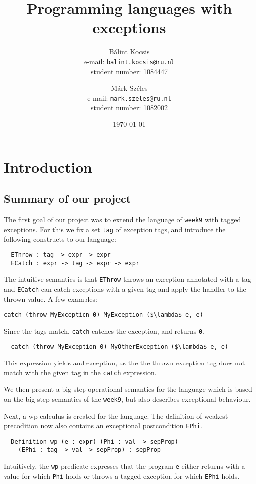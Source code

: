 \documentclass{article}
\title{Programming languages with exceptions}
\author{Bálint Kocsis \\ e-mail: \texttt{balint.kocsis@ru.nl} \\ student number: 1084447
\and
Márk Széles \\ e-mail: \texttt{mark.szeles@ru.nl} \\ student number: 1082002}
\date{\today}
\begin{document}
\maketitle

\section{Introduction}

\subsection{Summary of our project}

The first goal of our project was to extend the language of \texttt{week9} with tagged exceptions. For this we fix a set \texttt{tag} of exception tags, and introduce the following constructs to our language:
\begin{lstlisting}
  EThrow : tag -> expr -> expr
  ECatch : expr -> tag -> expr -> expr
\end{lstlisting}
The intuitive semantics is that \texttt{EThrow} throws an exception annotated with a tag and \texttt{ECatch} can catch exceptions with a given tag and apply the handler to the thrown value. A few examples:

\begin{lstlisting}[mathescape]
  catch (throw MyException 0) MyException ($\lambda$ e, e)
\end{lstlisting}
Since the tags match, \texttt{catch} catches the exception, and returns \texttt{0}.

\begin{lstlisting}
  catch (throw MyException 0) MyOtherException ($\lambda$ e, e)
\end{lstlisting}
This expression yields and exception, as the the thrown exception tag does not match with the given tag in the \texttt{catch} expression.

We then present a big-step operational semantics for the language which is based on the big-step semantics of the \texttt{week9}, but also describes exceptional behaviour.

Next, a wp-calculus is created for the language. The definition of weakest precodition now also contains an exceptional postcondition \texttt{EPhi}.
\begin{lstlisting}
  Definition wp (e : expr) (Phi : val -> sepProp) 
    (EPhi : tag -> val -> sepProp) : sepProp
\end{lstlisting}
Intuitively, the \texttt{wp} predicate expresses that the program \texttt{e} either returns with a value for which \texttt{Phi} holds or throws a tagged exception for which \texttt{EPhi} holds. 
\end{document}
